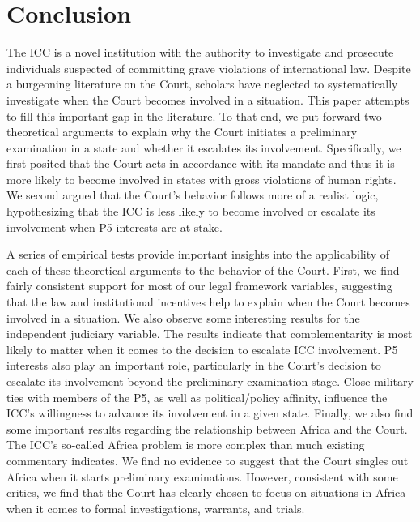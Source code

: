 \section*{Conclusion}

The ICC is a novel institution with the authority to investigate and prosecute individuals suspected of committing grave violations of international law. Despite a burgeoning literature on the Court, scholars have neglected to systematically investigate when the Court becomes involved in a situation. This paper attempts to fill this important gap in the literature. To that end, we put forward two theoretical arguments to explain why the Court initiates a preliminary examination in a state and whether it escalates its involvement. Specifically, we first posited that the Court acts in accordance with its mandate and thus it is more likely to become involved in states with gross violations of human rights. We second argued that the Court's behavior follows more of a realist logic, hypothesizing that the ICC is less likely to become involved or escalate its involvement when P5 interests are at stake.

A series of empirical tests provide important insights into the applicability of each of these theoretical arguments to the behavior of the Court. First, we find fairly consistent support for most of our legal framework variables, suggesting that the law and institutional incentives help to explain when the Court becomes involved in a situation. We also observe some interesting results for the independent judiciary variable. The results indicate that complementarity is most likely to matter when it comes to the decision to escalate ICC involvement. P5 interests also play an important role, particularly in the Court's decision to escalate its involvement beyond the preliminary examination stage. Close military ties with members of the P5, as well as political/policy affinity, influence the ICC's willingness to advance its involvement in a given state. Finally, we also find some important results regarding the relationship between Africa and the Court. The ICC's so-called Africa problem is more complex than much existing commentary indicates. We find no evidence to suggest that the Court singles out Africa when it starts preliminary examinations. However, consistent with some critics, we find that the Court has clearly chosen to focus on situations in Africa when it comes to formal investigations, warrants, and trials.

